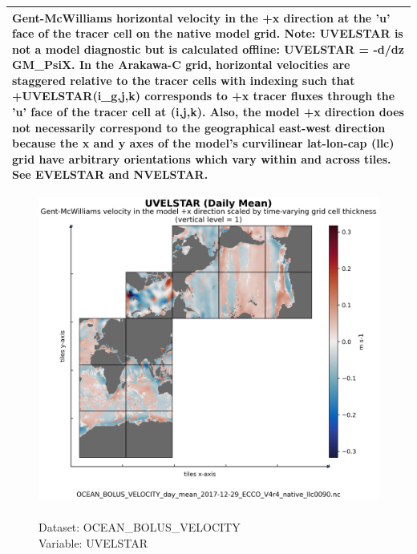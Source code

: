 \begin{longtable}{|p{}|p{}|p{}|p{}|}
\multicolumn{4}{|p{1\textwidth}|}{Gent-McWilliams horizontal velocity in the +x direction at the 'u' face of the tracer cell on the native model grid. Note: UVELSTAR is not a model diagnostic but is calculated offline: UVELSTAR = -d/dz GM\_PsiX. In the Arakawa-C grid, horizontal velocities are staggered relative to the tracer cells with indexing such that +UVELSTAR(i\_g,j,k) corresponds to +x tracer fluxes through the 'u' face of the tracer cell at (i,j,k). Also, the model +x direction does not necessarily correspond to the geographical east-west direction because the x and y axes of the model's curvilinear lat-lon-cap (llc) grid have arbitrary orientations which vary within and across tiles. See EVELSTAR and NVELSTAR.} \\ \hline
\end{longtable}

\begin{figure}[H]
\centering
\includegraphics[scale=0.5]{../images/plots/native_plots/Gent-McWilliams_Ocean_Bolus_Velocity/UVELSTAR.png}
\caption{\\Dataset: OCEAN\_BOLUS\_VELOCITY\\Variable: UVELSTAR}
\label{tab:table-OCEAN_BOLUS_VELOCITY_UVELSTAR-Plot}
\end{figure}
\pagebreak
